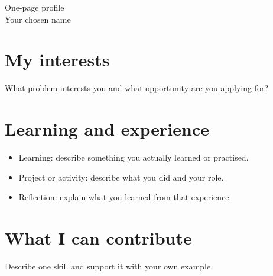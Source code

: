 \documentclass[11pt,a4paper]{article}
\begin{document}
\begin{center}
{\LARGE One-page profile}\\[0.5em]
Your chosen name
\end{center}
\section*{My interests}
What problem interests you and what opportunity are you applying for?
\section*{Learning and experience}
\begin{itemize}
\item Learning: describe something you actually learned or practised.
\item Project or activity: describe what you did and your role.
\item Reflection: explain what you learned from that experience.
\end{itemize}
\section*{What I can contribute}
Describe one skill and support it with your own example.
\end{document}

